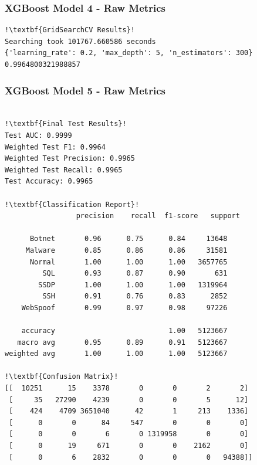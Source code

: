 \begin{appendices}
\subsubsection{XGBoost Model 4 - Raw Metrics}
\begin{lstlisting}[escapechar=!]
!\textbf{GridSearchCV Results}!
Searching took 101767.660586 seconds
{'learning_rate': 0.2, 'max_depth': 5, 'n_estimators': 300}
0.9964800321988857
\end{lstlisting}

\subsubsection{XGBoost Model 5 - Raw Metrics}
\begin{lstlisting}[escapechar=!]

!\textbf{Final Test Results}!
Test AUC: 0.9999
Weighted Test F1: 0.9964
Weighted Test Precision: 0.9965
Weighted Test Recall: 0.9965
Test Accuracy: 0.9965

!\textbf{Classification Report}!
			     precision    recall  f1-score   support

      Botnet       0.96      0.75      0.84     13648
     Malware       0.85      0.86      0.86     31581
      Normal       1.00      1.00      1.00   3657765
         SQL       0.93      0.87      0.90       631
        SSDP       1.00      1.00      1.00   1319964
         SSH       0.91      0.76      0.83      2852
    WebSpoof       0.99      0.97      0.98     97226

    accuracy                           1.00   5123667
   macro avg       0.95      0.89      0.91   5123667
weighted avg       1.00      1.00      1.00   5123667
    
!\textbf{Confusion Matrix}!    
[[  10251      15    3378       0       0       2       2]
 [     35   27290    4239       0       0       5      12]
 [    424    4709 3651040      42       1     213    1336]
 [      0       0      84     547       0       0       0]
 [      0       0       6       0 1319958       0       0]
 [      0      19     671       0       0    2162       0]
 [      0       6    2832       0       0       0   94388]]

\end{lstlisting}


\end{appendices}
